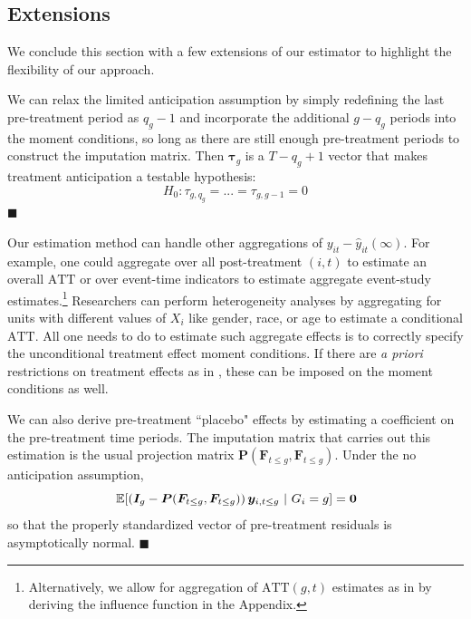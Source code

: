 \documentclass[12pt]{article}
\def\ATT{\text{ATT}}
\begin{document}
\subsection{Extensions}

We conclude this section with a few extensions of our estimator to highlight the flexibility of our approach.

\begin{remark}
We can relax the limited anticipation assumption by simply redefining the last pre-treatment period as $q_g - 1$ and incorporate the additional $g - q_g$ periods into the moment conditions, so long as there are still enough pre-treatment periods to construct the imputation matrix. Then $\bm \tau_g$ is a $T - q_g + 1$ vector that makes treatment anticipation a testable hypothesis:
\begin{equation}
H_0: \tau_{g,q_g} = ... = \tau_{g,g-1} = 0 
\end{equation}
$\blacksquare$
\end{remark} 

\begin{remark}

Our estimation method can handle other aggregations of $y_{it} - \hat{y}_{it}(\infty)$. For example, one could aggregate over all post-treatment $(i,t)$ to estimate an overall $\ATT$ or over event-time indicators to estimate aggregate event-study estimates.\footnote{Alternatively, we allow for aggregation of $\ATT(g,t)$ estimates as in \citet{Callaway_Santanna_2021} by deriving the influence function in the Appendix.
} Researchers can perform heterogeneity analyses by aggregating for units with different values of $X_i$ like gender, race, or age to estimate a conditional $\ATT$. All one needs to do to estimate such aggregate effects is to correctly specify the unconditional treatment effect moment conditions. If there are \emph{a priori} restrictions on treatment effects as in \citet{Borusyak_Jaravel_Spiess_2021}, these can be imposed on the moment conditions as well. 

We can also derive pre-treatment ``placebo" effects by estimating a coefficient on the pre-treatment time periods. The imputation matrix that carries out this estimation is the usual projection matrix $\bm P(\bm F_{t \leq g}, \bm F_{t \leq g})$. Under the no anticipation assumption, 
\begin{equation}
  \expec{ \left( \bm I_{g} - \bm P(\bm F_{t \leq g}, \bm F_{t \leq g}) \right) \bm y_{i, t \leq g}}{G_i = g} = \bm 0
\end{equation}
so that the properly standardized vector of pre-treatment residuals is asymptotically normal. $\blacksquare$
\end{remark}
\end{document}

